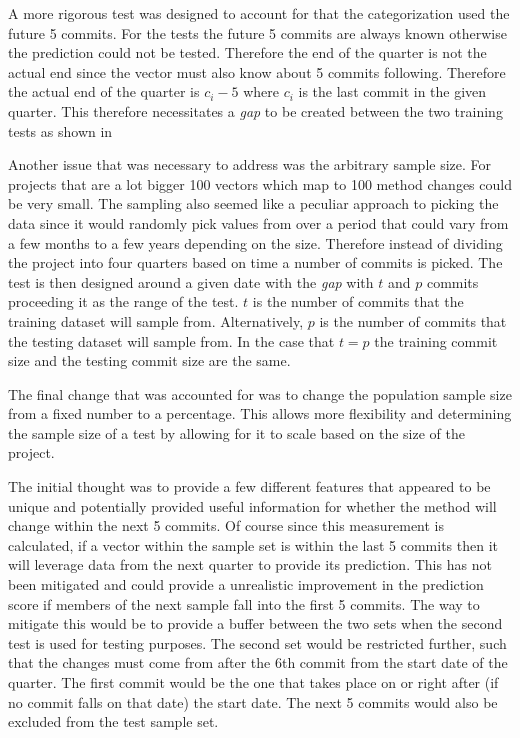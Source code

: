 A more rigorous test was designed to account for that the categorization used the future 5 commits. For the tests the future 5 commits are always known otherwise the prediction could not be tested. Therefore the end of the quarter is not the actual end since the vector must also know about 5 commits following. Therefore the actual end of the quarter is $c_i - 5$ where $c_i$ is the last commit in the given quarter. This therefore necessitates a \textit{gap} to be created between the two training tests as shown in %


Another issue that was necessary to address was the arbitrary sample size. For projects that are a lot bigger 100 vectors which map to 100 method changes could be very small. The sampling also seemed like a peculiar approach to picking the data since it would randomly pick values from over a period that could vary from a few months to a few years depending on the size. Therefore instead of dividing the project into four quarters based on time a number of commits is picked. The test is then designed around a given date with the \textit{gap} with $t$ and $p$ commits proceeding it as the range of the test. $t$ is the number of commits that the training dataset will sample from. Alternatively, $p$ is the number of commits that the testing dataset will sample from. In the case that $t = p$ the training commit size and the testing commit size are the same.


The final change that was accounted for was to change the population sample size from a fixed number to a percentage. This allows more flexibility and determining the sample size of a test by allowing for it to scale based on the size of the project. 



The initial thought was to provide a few different features that appeared to be unique and potentially provided useful information for whether the method will change within the next 5 commits. Of course since this measurement is calculated, if a vector within the sample set is within the last 5 commits then it will leverage data from the next quarter to provide its prediction. This has not been mitigated and could provide a unrealistic improvement in the prediction score if members of the next sample fall into the first 5 commits. The way to mitigate this would be to provide a buffer between the two sets when the second test is used for testing purposes. The second set would be restricted further, such that the changes must come from after the 6th commit from the start date of the quarter. The first commit would be the one that takes place on or right after (if no commit falls on that date) the start date. The next 5 commits would also be excluded from the test sample set.

